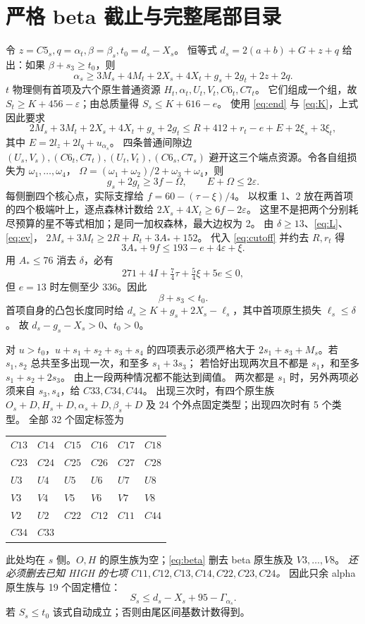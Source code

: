 \documentclass[11pt,a4paper]{article}
\newcommand{\A}{A_*}
\newcommand{\eps}{\varepsilon}
\begin{document}
\section{严格 beta 截止与完整尾部目录}
令 $z=C5_s,q=\alpha_t,\beta=\beta_s,t_0=d_s-X_s$。
恒等式 $d_s=2(a+b)+G+z+q$ 给出：如果 $\beta+s_3\ge t_0$，则
\[
\alpha_s\ge3M_s+4M_t+2X_s+4X_t+g_s+2g_t+2z+2q.
\]
$t$ 物理侧有首项及六个原生普通资源 $H_t,\alpha_t,U_t,V_t,C6_t,C7_t$。
它们组成一个组，故 $S_t\ge K+456-\eps$；由总质量得 $S_s\le K+616-e$。
使用 \eqref{eq:end} 与 \eqref{eq:K}，上式因此要求
\begin{equation}\label{eq:cutoff}
2M_s+3M_t+2X_s+4X_t+g_s+2g_t
\le R+412+r_t-e+E+2\xi_s+3\xi_t,
\end{equation}
其中 $E=2l_z+2l_q+u_{\alpha_s}$。
四条普通间隙边 $(U_s,V_s),(C6_t,C7_t),(U_t,V_t),(C6_s,C7_s)$
避开这三个端点资源。令各自组损失为 $\omega_1,\ldots,\omega_4$，
$\Omega=(\omega_1+\omega_2)/2+\omega_3+\omega_4$，则
\[g_s+2g_t\ge3f-\Omega,\qquad E+\Omega\le2\eps.\]
每侧删四个核心点，实际支撑给 $f=60-(\tau-\xi)/4$。
以权重 1、2 放在两首项的四个极端叶上，逐点森林计数给
$2X_s+4X_t\ge6f-2\eps$。
这里不是把两个分别耗尽预算的星不等式相加；是同一加权森林，最大边权为 2。
由 $\delta\ge13$、\eqref{eq:L}、\eqref{eq:ev}，
$2M_s+3M_t\ge2R+R_t+3\A+152$。
代入 \eqref{eq:cutoff} 并约去 $R,r_t$ 得
\[
3\A+9f\le193-e+4\eps+\xi.
\]
用 $\A\le76$ 消去 $\delta$，必有
\[271+4I+\tfrac74\tau+\tfrac54\xi+5e\le0,\]
但 $e=13$ 时左侧至少 336。因此
\begin{equation}\label{eq:beta}
\boxed{\beta+s_3<t_0.}
\end{equation}
首项自身的凸包长度同时给
$d_s\ge K+g_s+2X_s-\ell_s$，其中首项原生损失 $\ell_s\le\delta$。
故 $d_s-g_s-X_s>0$、$t_0>0$。

对 $u>t_0$，$u+s_1+s_2+s_3+s_4$ 的四项表示必须严格大于
$2s_1+s_3+M_s$。若 $s_1,s_2$ 总共至多出现一次，和至多 $s_1+3s_3$；
若恰好出现两次且不都是 $s_1$，和至多 $s_1+s_2+2s_3$。
由上一段两种情况都不能达到阈值。
两次都是 $s_1$ 时，另外两项必须来自 $s_3,s_4$，给 $C33,C34,C44$。
出现三次时，有四个原生族 $O_s+D,H_s+D,\alpha_s+D,\beta_s+D$
及 24 个外点固定类型；出现四次时有 5 个类型。
全部 32 个固定标签为
\begin{center}\small
\begin{tabular}{llllll}
$C13$&$C14$&$C15$&$C16$&$C17$&$C18$\\
$C23$&$C24$&$C25$&$C26$&$C27$&$C28$\\
$U3$&$U4$&$U5$&$U6$&$U7$&$U8$\\
$V3$&$V4$&$V5$&$V6$&$V7$&$V8$\\
$V2$&$U2$&$C22$&$C12$&$C11$&$C44$\\
$C34$&$C33$&&&&
\end{tabular}
\end{center}
此处均在 $s$ 侧。$O,H$ 的原生族为空；\eqref{eq:beta} 删去 beta 原生族及 $V3,\ldots,V8$。
\emph{还必须删去已知 HIGH 的七项 $C11,C12,C13,C14,C22,C23,C24$。}
因此只余 alpha 原生族与 19 个固定槽位：
\begin{equation}\label{eq:tail19}
S_s\le d_s-X_s+95-\Gamma_{\alpha_s}.
\end{equation}
若 $S_s\le t_0$ 该式自动成立；否则由尾区间基数计数得到。
\end{document}
